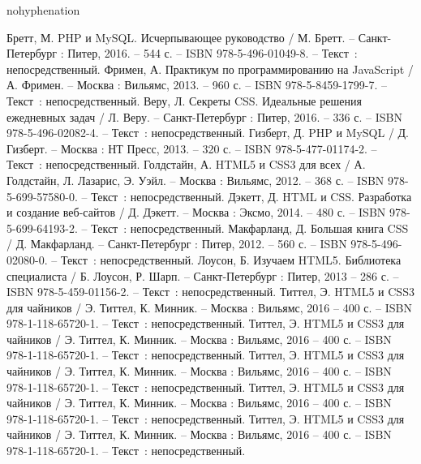 \newsection
{}

\begin{hyphenrules}{nohyphenation} %
  \begin{thebibliography}{9}

     Бретт, М. PHP и MySQL. Исчерпывающее руководство / М. Бретт. – Санкт-Петербург : Питер, 2016. – 544 с. – ISBN 978-5-496-01049-8. – Текст~: непосредственный.
     Фримен, А. Практикум по программированию на JavaScript / А. Фримен. – Москва : Вильямс, 2013. – 960 с. – ISBN 978-5-8459-1799-7. – Текст~: непосредственный.
     Веру, Л. Секреты CSS. Идеальные решения ежедневных задач / Л. Веру. – Санкт-Петербург : Питер, 2016. – 336 с. – ISBN 978-5-496-02082-4. – Текст~: непосредственный.
    	Гизберт, Д. PHP и MySQL / Д. Гизберт. – Москва : НТ Пресс, 2013. – 320 с. – ISBN 978-5-477-01174-2. – Текст~: непосредственный.
		Голдстайн, А. HTML5 и CSS3 для всех / А. Голдстайн, Л. Лазарис, Э. Уэйл. – Москва : Вильямс, 2012. – 368 с. – ISBN 978-5-699-57580-0. – Текст~: непосредственный.
		Дэкетт, Д. HTML и CSS. Разработка и создание веб-сайтов / Д. Дэкетт. – Москва : Эксмо, 2014. – 480 с. – ISBN 978-5-699-64193-2. – Текст~: непосредственный.
		Макфарланд, Д. Большая книга CSS / Д. Макфарланд. – Санкт-Петербург : Питер, 2012. – 560 с. – ISBN 978-5-496-02080-0. – Текст~: непосредственный.
		Лоусон, Б. Изучаем HTML5. Библиотека специалиста / Б. Лоусон, Р. Шарп. – Санкт-Петербург : Питер, 2013 – 286 с. – ISBN 978-5-459-01156-2. – Текст~: непосредственный.
		Титтел, Э. HTML5 и CSS3 для чайников / Э. Титтел, К. Минник. – Москва : Вильямс, 2016 – 400 с. – ISBN 978-1-118-65720-1. – Текст~: непосредственный.    
		Титтел, Э. HTML5 и CSS3 для чайников / Э. Титтел, К. Минник. – Москва : Вильямс, 2016 – 400 с. – ISBN 978-1-118-65720-1. – Текст~: непосредственный.    
		Титтел, Э. HTML5 и CSS3 для чайников / Э. Титтел, К. Минник. – Москва : Вильямс, 2016 – 400 с. – ISBN 978-1-118-65720-1. – Текст~: непосредственный.    
		Титтел, Э. HTML5 и CSS3 для чайников / Э. Титтел, К. Минник. – Москва : Вильямс, 2016 – 400 с. – ISBN 978-1-118-65720-1. – Текст~: непосредственный.    
		Титтел, Э. HTML5 и CSS3 для чайников / Э. Титтел, К. Минник. – Москва : Вильямс, 2016 – 400 с. – ISBN 978-1-118-65720-1. – Текст~: непосредственный.    
  \end{thebibliography}
\end{hyphenrules}
